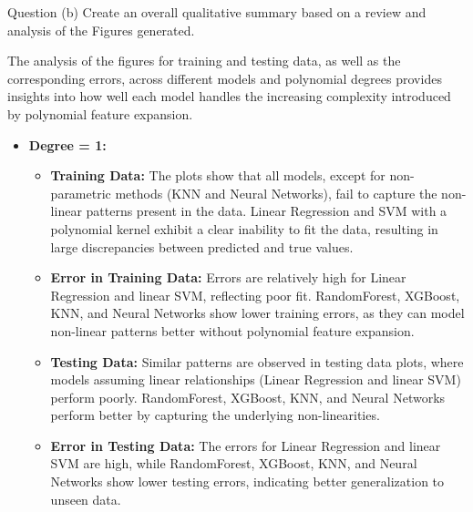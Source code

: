 \clearpage

\begin{customboxnew}[label={box:Q3b}]{Question (b)}
	Create an overall qualitative summary based on a review and analysis of the Figures generated.
\end{customboxnew}

The analysis of the figures for training and testing data, as well as the corresponding errors, across different models and polynomial degrees provides insights into how well each model handles the increasing complexity introduced by polynomial feature expansion.

\begin{itemize}
    \item \textbf{Degree = 1:}
    \begin{itemize}
        \item \textbf{Training Data:} The plots show that all models, except for non-parametric methods (KNN and Neural Networks), fail to capture the non-linear patterns present in the data. Linear Regression and SVM with a polynomial kernel exhibit a clear inability to fit the data, resulting in large discrepancies between predicted and true values.
        \item \textbf{Error in Training Data:} Errors are relatively high for Linear Regression and linear SVM, reflecting poor fit. RandomForest, XGBoost, KNN, and Neural Networks show lower training errors, as they can model non-linear patterns better without polynomial feature expansion.
        \item \textbf{Testing Data:} Similar patterns are observed in testing data plots, where models assuming linear relationships (Linear Regression and linear SVM) perform poorly. RandomForest, XGBoost, KNN, and Neural Networks perform better by capturing the underlying non-linearities.
        \item \textbf{Error in Testing Data:} The errors for Linear Regression and linear SVM are high, while RandomForest, XGBoost, KNN, and Neural Networks show lower testing errors, indicating better generalization to unseen data.
    \end{itemize}


\end{itemize}
